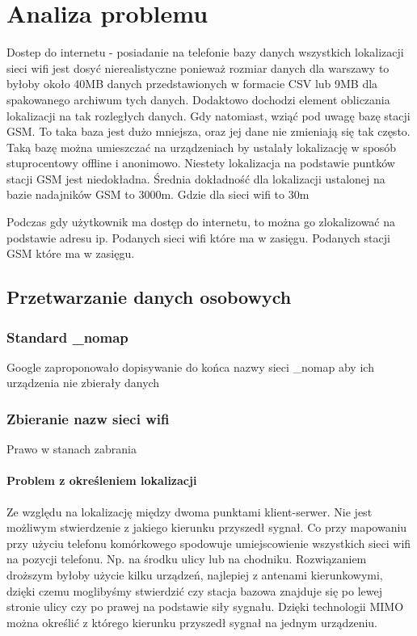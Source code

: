 \chapter{Analiza problemu}
Dostep do internetu - posiadanie na telefonie bazy danych wszystkich lokalizacji sieci wifi jest dosyć nierealistyczne ponieważ rozmiar danych dla warszawy to byłoby około 40MB danych przedstawionych w formacie CSV lub 9MB dla spakowanego archiwum tych danych. Dodaktowo dochodzi element obliczania lokalizacji na tak rozległych danych. Gdy natomiast, wziąć pod uwagę bazę stacji GSM. To taka baza jest dużo mniejsza, oraz jej dane nie zmieniają się tak często. Taką bazę można umieszczać na urządzeniach by ustalały lokalizację w sposób stuprocentowy offline i anonimowo. Niestety lokalizacja na podstawie puntków stacji GSM jest niedokładna. Średnia dokładność dla lokalizacji ustalonej na bazie nadajników GSM to 3000m. Gdzie dla sieci wifi to 30m


Podczas gdy użytkownik ma dostęp do internetu, to można go zlokalizować na podstawie adresu ip. Podanych sieci wifi które ma w zasięgu. Podanych stacji GSM które ma w zasięgu.

\section{Przetwarzanie danych osobowych}

\subsection{Standard \_nomap}
Google zaproponowało dopisywanie do końca nazwy sieci _nomap aby ich urządzenia nie zbierały danych
\subsection{Zbieranie nazw sieci wifi}
Prawo w stanach zabrania

\subsubsection{Problem z określeniem lokalizacji}
Ze względu na lokalizację między dwoma punktami klient-serwer. Nie jest możliwym stwierdzenie z jakiego kierunku przyszedł sygnał. Co przy mapowaniu przy użyciu telefonu komórkowego spodowuje umiejscowienie wszystkich sieci wifi na pozycji telefonu. Np. na środku ulicy lub na chodniku.
Rozwiązaniem droższym byłoby użycie kilku urządzeń, najlepiej z antenami kierunkowymi, dzięki czemu moglibyśmy stwierdzić czy stacja bazowa znajduje się po lewej stronie ulicy czy po prawej na podstawie siły sygnału.
Dzięki technologii MIMO można określić z którego kierunku przyszedł sygnał na jednym urządzeniu.

